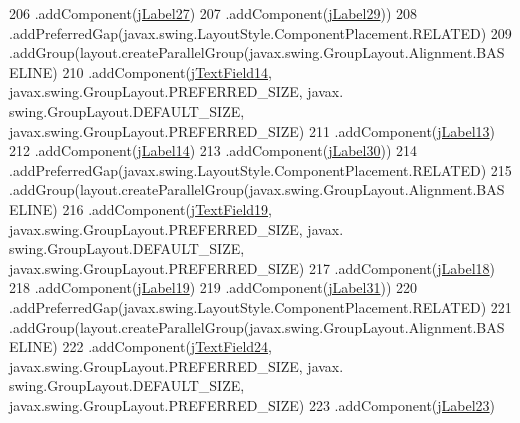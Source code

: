 \begin{DoxyCode}
206                     .addComponent(\mbox{\hyperlink{classinterfacessoguar_1_1paenrique_a2f3f435766dfa8d25ce72db778454f41}{jLabel27}})
207                     .addComponent(\mbox{\hyperlink{classinterfacessoguar_1_1paenrique_acb0b1be4c242fe2664aef099461f11b3}{jLabel29}}))
208                 .addPreferredGap(javax.swing.LayoutStyle.ComponentPlacement.RELATED)
209                 .addGroup(layout.createParallelGroup(javax.swing.GroupLayout.Alignment.BASELINE)
210                     .addComponent(\mbox{\hyperlink{classinterfacessoguar_1_1paenrique_aa8f99e5eec16f87bcbd493e159554332}{jTextField14}}, javax.swing.GroupLayout.PREFERRED\_SIZE, javax.
      swing.GroupLayout.DEFAULT\_SIZE, javax.swing.GroupLayout.PREFERRED\_SIZE)
211                     .addComponent(\mbox{\hyperlink{classinterfacessoguar_1_1paenrique_a4b950a5b2a126d8b9d9bcb1578605f13}{jLabel13}})
212                     .addComponent(\mbox{\hyperlink{classinterfacessoguar_1_1paenrique_a3155f4aea6f0a87b75cb71152763fe4a}{jLabel14}})
213                     .addComponent(\mbox{\hyperlink{classinterfacessoguar_1_1paenrique_a592d4e690f30eaa5c1c7626271d513f2}{jLabel30}}))
214                 .addPreferredGap(javax.swing.LayoutStyle.ComponentPlacement.RELATED)
215                 .addGroup(layout.createParallelGroup(javax.swing.GroupLayout.Alignment.BASELINE)
216                     .addComponent(\mbox{\hyperlink{classinterfacessoguar_1_1paenrique_af87913542063bf9f8df4c2adeb0da744}{jTextField19}}, javax.swing.GroupLayout.PREFERRED\_SIZE, javax.
      swing.GroupLayout.DEFAULT\_SIZE, javax.swing.GroupLayout.PREFERRED\_SIZE)
217                     .addComponent(\mbox{\hyperlink{classinterfacessoguar_1_1paenrique_a81a2ccdeb485bf8ec4bdc5f952b83e21}{jLabel18}})
218                     .addComponent(\mbox{\hyperlink{classinterfacessoguar_1_1paenrique_ab4f7d75f1e894ee3d7f89612ca7f300c}{jLabel19}})
219                     .addComponent(\mbox{\hyperlink{classinterfacessoguar_1_1paenrique_a9a9d32bd5f42fadfd293170415a4ebae}{jLabel31}}))
220                 .addPreferredGap(javax.swing.LayoutStyle.ComponentPlacement.RELATED)
221                 .addGroup(layout.createParallelGroup(javax.swing.GroupLayout.Alignment.BASELINE)
222                     .addComponent(\mbox{\hyperlink{classinterfacessoguar_1_1paenrique_a7c88cab75dfa57f0ba92d8c84f8851d2}{jTextField24}}, javax.swing.GroupLayout.PREFERRED\_SIZE, javax.
      swing.GroupLayout.DEFAULT\_SIZE, javax.swing.GroupLayout.PREFERRED\_SIZE)
223                     .addComponent(\mbox{\hyperlink{classinterfacessoguar_1_1paenrique_a925293df4e0f65ac4b51ef429935f333}{jLabel23}})

\end{DoxyCode}
